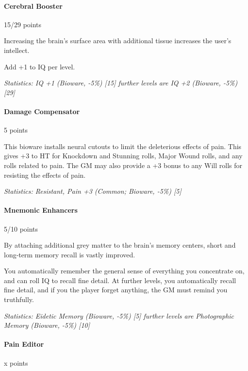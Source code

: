 \begin{multicols*}{3}
	\paragraph{Cerebral Booster}
	\begin{flushright}
		15/29 points
	\end{flushright}
	
	Increasing the brain's surface area with additional tissue increases the user's intellect. 
	
	Add +1 to IQ per level. 
	
	\textit{\textcolor{OliveGreen}{Statistics: IQ +1 (Bioware, -5\%) [15] further levels are IQ +2 (Bioware, -5\%) [29]}}
	
	\paragraph{Damage Compensator}
	\begin{flushright}
		5 points
	\end{flushright}
	
	This bioware installs neural cutouts to limit the deleterious effects of pain. This gives +3 to HT for Knockdown and Stunning rolls, Major Wound rolls, and any rolls related to pain. The GM may also provide a +3 bonus to any Will rolls for resisting the effects of pain.
	
	\textit{\textcolor{OliveGreen}{Statistics: Resistant, Pain +3 (Common; Bioware, -5\%) [5] }}
	
	\paragraph{Mnemonic Enhancers}
	\begin{flushright}
		5/10 points
	\end{flushright}
	
	By attaching additional grey matter to the brain's memory centers, short and long-term memory recall is vastly improved. 
	
	You automatically remember the general sense of everything you concentrate on, and can roll IQ to recall fine detail. At further levels, you automatically recall fine detail, and if you the player forget anything, the GM must remind you truthfully. 
	
	\textit{\textcolor{OliveGreen}{Statistics: Eidetic Memory (Bioware, -5\%) [5] further levels are Photographic Memory (Bioware, -5\%) [10]}}
	
	\paragraph{Pain Editor}
	\begin{flushright}
		x points
	\end{flushright}


\end{multicols*}
